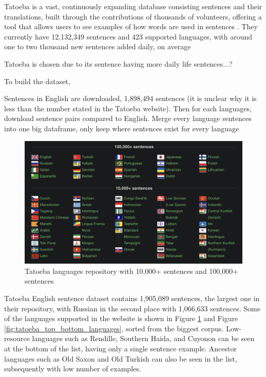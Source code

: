 \documentclass[a4paper]{article}
\begin{document}
Tatoeba is a vast, continuously expanding database consisting sentences and their translations, built through the contributions of thousands of volunteers, offering a tool that allows users to see examples of how words are used in sentences \cite{tatoeba}. They currently have 12,132,349 sentences and 423 supported languages, with around one to two thousand new sentences added daily, on average

Tatoeba is chosen due to its sentence having more daily life sentences...?

To build the dataset,

Sentences in English are downloaded, 1,898,494 sentences (it is unclear why it is less than the number stated in the Tatoeba website). Then for each languages, download sentence pairs compared to English. Merge every language sentences into one big dataframe, only keep where sentences exist for every language

\begin{figure}[htbp]
    \centering
    \includegraphics[width=0.9\linewidth]{images/tatoeba_languages.png}
    \caption{Tatoeba languages repository with 10,000+ sentences and 100,000+ sentences \cite{tatoeba}}
    \label{fig:tatoeba_languages}
\end{figure}

Tatoeba English sentence dataset contains 1,905,089 sentences, the largest one in their repository, with Russian in the second place with 1,066,633 sentences. Some of the languages supported in the website is shown in Figure \ref{fig:tatoeba_languages} and Figure \ref{fig:tatoeba_top_bottom_languages}, sorted from the biggest corpus. Low-resource languages such as Rendille, Southern Haida, and Cuyonon can be seen at the bottom of the list, having only a single sentence example. Ancestor languages such as Old Saxon and Old Turkish can also be seen in the list, subsequently with low number of examples.
\end{document}
